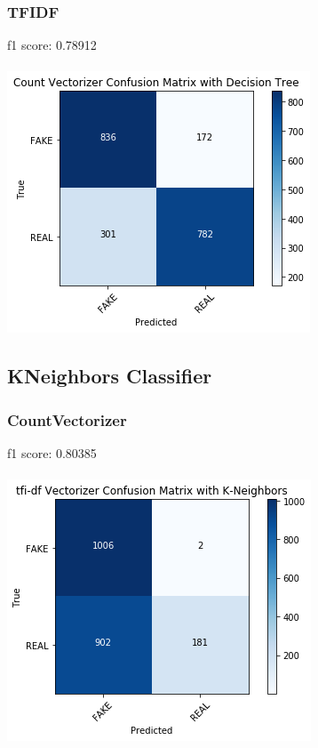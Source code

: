 \documentclass[twoside,twocolumn]{article}
\begin{document}
    \subsubsection{TFIDF}
    f1 score: 0.78912\\
    \\ \noindent \includegraphics[scale=0.6]{tree_tfidf.png}

    \subsection{KNeighbors Classifier}
    \subsubsection{CountVectorizer}
    f1 score: 0.80385\\
    \\ \noindent \includegraphics[scale=0.6]{knn_count.png}
\end{document}

